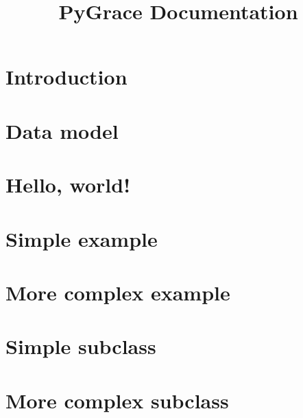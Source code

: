 \documentclass[12pt]{article}
\title{PyGrace Documentation}
\date{}
\begin{document}
\maketitle

\section*{Introduction}

\section*{Data model}

\section*{Hello, world!}

\section*{Simple example}

\section*{More complex example}

\section*{Simple subclass}

\section*{More complex subclass}

\end{document}
